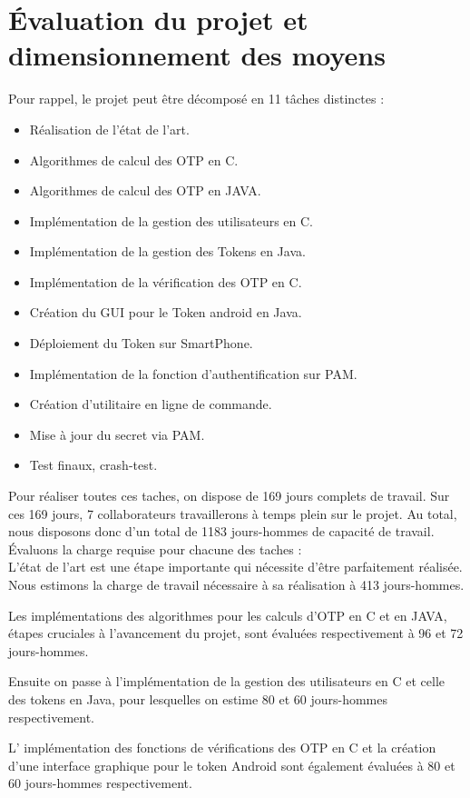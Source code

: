 \documentclass{../../res/univ-projet}
\begin{document}
\section{Évaluation du projet et dimensionnement des moyens}
	Pour rappel, le projet peut être décomposé en 11 tâches distinctes :
	\begin{itemize}
	  \item Réalisation de l'état de l'art.
	  \item Algorithmes de calcul des OTP en C.
	  \item Algorithmes de calcul des OTP en JAVA.
	  \item Implémentation de la gestion des utilisateurs en C.
	  \item Implémentation de la gestion des Tokens en Java.
	  \item Implémentation de la vérification des OTP en C.
	  \item Création du GUI pour le Token android en Java.
	  \item Déploiement du Token sur SmartPhone.
	  \item Implémentation de la fonction d'authentification sur PAM.
	  \item Création d'utilitaire en ligne de commande.
	  \item Mise à jour du secret via PAM.
	  \item Test finaux, crash-test.\\
	\end{itemize}

	Pour réaliser toutes ces taches, on dispose de 169 jours complets de travail. Sur ces 169 jours, 7 collaborateurs travaillerons à temps plein sur le projet. Au total, nous disposons donc d'un total de 1183 jours-hommes de capacité de travail. Évaluons la charge requise pour chacune des taches :\\
	
	L'état de l'art est une étape importante qui nécessite d'être parfaitement réalisée. Nous estimons la charge de travail nécessaire à sa réalisation à 413 jours-hommes.
	
	Les implémentations des algorithmes pour les calculs d'OTP en C et en JAVA, étapes cruciales à l'avancement du projet, sont évaluées respectivement à 96 et 72 jours-hommes.
	
	Ensuite on passe à l'implémentation de la gestion des utilisateurs en C et celle des tokens en Java, pour lesquelles on estime 80 et 60 jours-hommes respectivement.
	
	L' implémentation des fonctions de vérifications des OTP en C et la création d'une interface graphique pour le token Android sont également évaluées à 80 et 60 jours-hommes respectivement. 
	
\end{document}
